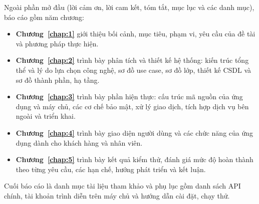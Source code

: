 Ngoài phần mở đầu (lời cảm ơn, lời cam kết, tóm tắt, mục lục và các danh mục), báo cáo gồm năm chương:
\begin{itemize}
	\item \textbf{Chương~\ref{chap:1}} giới thiệu bối cảnh, mục tiêu, phạm vi, yêu cầu của đề tài và phương pháp thực hiện.
	\item \textbf{Chương~\ref{chap:2}} trình bày phân tích và thiết kế hệ thống: kiến trúc tổng thể và lý do lựa chọn công nghệ, sơ đồ use case, sơ đồ lớp, thiết kế CSDL và sơ đồ thành phần, hạ tầng.
	\item \textbf{Chương~\ref{chap:3}} trình bày phần hiện thực: cấu trúc mã nguồn của ứng dụng và máy chủ, các cơ chế bảo mật, xử lý giao dịch, tích hợp dịch vụ bên ngoài và triển khai.
	\item \textbf{Chương~\ref{chap:4}} trình bày giao diện người dùng và các chức năng của ứng dụng dành cho khách hàng và nhân viên.
	\item \textbf{Chương~\ref{chap:5}} trình bày kết quả kiểm thử, đánh giá mức độ hoàn thành theo từng yêu cầu, các hạn chế, hướng phát triển và kết luận.
\end{itemize}
Cuối báo cáo là danh mục tài liệu tham khảo và phụ lục gồm danh sách API chính, tài khoản trình diễn trên máy chủ và hướng dẫn cài đặt, chạy thử.
